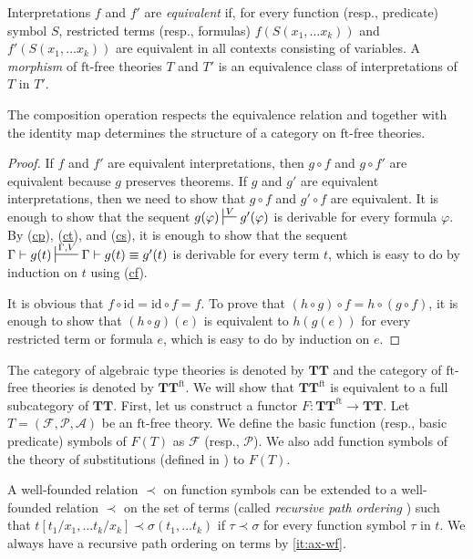 \documentclass[reqno]{amsart}
\newcommand{\axref}[1]{(\hyperref[ax:#1]{#1})}
\theoremstyle{definition}
\theoremstyle{remark}
\newcommand{\fs}[1]{\mathrm{#1}}
\newcommand{\ft}{\fs{ft}}
\newcommand{\id}{\fs{id}}
\newcommand{\cat}[1]{\mathbf{#1}}
\newcommand{\algtt}{\cat{TT}}
\numberwithin{figure}{section}
\begin{document}
Interpretations $f$ and $f'$ are \emph{equivalent} if, for every function (resp., predicate) symbol $S$, restricted terms (resp., formulas) $f(S(x_1, \ldots x_k))$ and $f'(S(x_1, \ldots x_k))$ are equivalent in all contexts consisting of variables.
A \emph{morphism} of $\ft$-free theories $T$ and $T'$ is an equivalence class of interpretations of $T$ in $T'$.

\begin{prop}
The composition operation respects the equivalence relation and together with the identity map determines the structure of a category on $\ft$-free theories.
\end{prop}
\begin{proof}
If $f$ and $f'$ are equivalent interpretations, then $g \circ f$ and $g \circ f'$ are equivalent because $g$ preserves theorems.
If $g$ and $g'$ are equivalent interpretations, then we need to show that $g \circ f$ and $g' \circ f$ are equivalent.
It is enough to show that the sequent $g(\varphi) \sststile{}{V} g'(\varphi)$ is derivable for every formula $\varphi$.
By \axref{cp}, \axref{ct}, and \axref{cs}, it is enough to show that the sequent $\Gamma \vdash g(t) \sststile{}{\Gamma,V} \Gamma \vdash g(t) \equiv g'(t)$ is derivable for every term $t$, which is easy to do by induction on $t$ using \axref{cf}.

It is obvious that $f \circ \id = \id \circ f = f$.
To prove that $(h \circ g) \circ f = h \circ (g \circ f)$, it is enough to show that $(h \circ g)(e)$ is equivalent to $h(g(e))$ for every restricted term or formula $e$, which is easy to do by induction on $e$.
\end{proof}

The category of algebraic type theories is denoted by $\algtt$ and the category of $\ft$-free theories is denoted by $\algtt^\ft$.
We will show that $\algtt^\ft$ is equivalent to a full subcategory of $\algtt$.
First, let us construct a functor $F : \algtt^\ft \to \algtt$.
Let $T = (\mathcal{F},\mathcal{P},\mathcal{A})$ be an $\ft$-free theory.
We define the basic function (resp., basic predicate) symbols of $F(T)$ as $\mathcal{F}$ (resp., $\mathcal{P}$).
We also add function symbols of the theory of substitutions (defined in \cite[Section~3.1]{alg-tt}) to $F(T)$.

A well-founded relation $\prec$ on function symbols can be extended to a well-founded relation $\prec$ on the set of terms (called \emph{recursive path ordering} \cite{mrpo}) such that $t[t_1/x_1, \ldots t_k/x_k] \prec \sigma(t_1, \ldots t_k)$ if $\tau \prec \sigma$ for every function symbol $\tau$ in $t$.
We always have a recursive path ordering on terms by \eqref{it:ax-wf}.
\end{document}
